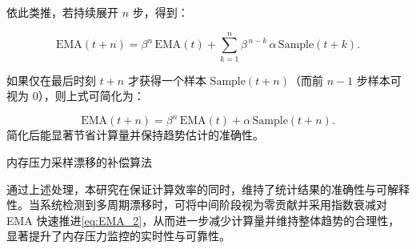 依此类推，若持续展开 \(n\) 步，得到：

\begin{equation}
\text{EMA}(t+n) = \beta^n \,\text{EMA}(t) + \sum_{k=1}^{n} \beta^{\,n-k} \, \alpha \,\text{Sample}(t+k).
\end{equation}

如果仅在最后时刻 \(t+n\) 才获得一个样本 \(\text{Sample}(t+n)\)（而前 \(n-1\) 步样本可视为 0），则上式可简化为：

\begin{equation}
\label{eq:EMA_2}
\text{EMA}(t+n) = \beta^n \,\text{EMA}(t) + \alpha \,\text{Sample}(t+n).
\end{equation}
简化后能显著节省计算量并保持趋势估计的准确性。

\begin{algorithm}[H]
    \caption{内存压力采样漂移的补偿算法}
    \label{alg:mp-drift-compensation}

    \SetAlgoLined
    \LinesNumbered
\end{algorithm}


通过上述处理，本研究在保证计算效率的同时，维持了统计结果的准确性与可解释性。当系统检测到多周期漂移时，可将中间阶段视为零贡献并采用指数衰减对 EMA 快速推进\ref{eq:EMA_2}，从而进一步减少计算量并维持整体趋势的合理性，显著提升了内存压力监控的实时性与可靠性。




